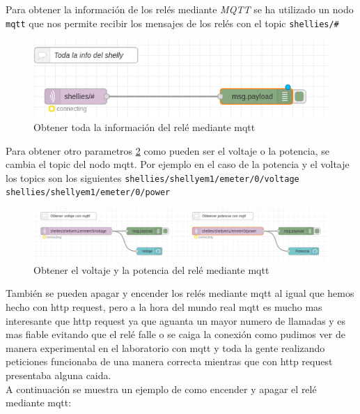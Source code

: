 \documentclass[11pt, letterpaper]{article}
\begin{document}
Para obtener la información de los relés mediante \textit{MQTT} se ha utilizado un nodo \texttt{mqtt} que nos permite 
recibir los mensajes de los relés con el topic \texttt{shellies/\#} 

\begin{figure}[h]
    \centering
    \includegraphics[width=\textwidth]{info_shelly_mqtt.png}
    \caption{Obtener toda la información del relé mediante mqtt} 
    \label{fig:info_shelly_mqtt}
\end{figure}
\pagebreak
Para obtener otro parametros \ref{fig:voltaje_pontencia_mqtt} como pueden ser el voltaje o la potencia, se cambia el topic del nodo mqtt.
Por ejemplo en el caso de la potencia y el voltaje los topics son los siguientes \texttt{shellies/shellyem1/emeter/0/voltage}
\texttt{shellies/shellyem1/emeter/0/power} 

\begin{figure}[h]
    \centering
    \includegraphics[width=\textwidth]{Voltaje_potencia_mqtt.png}
    \caption{Obtener el voltaje y la potencia del relé mediante mqtt}
    \label{fig:voltaje_pontencia_mqtt}
\end{figure}

También se pueden apagar y encender los relés mediante mqtt al igual que hemos hecho con http request, pero a la hora 
del mundo real mqtt es mucho mas interesante que http request ya que aguanta un mayor numero de llamadas y es mas fiable evitando 
que el relé falle o se caiga la conexión como pudimos ver de manera experimental en el laboratorio con mqtt y toda la gente realizando peticiones
funcionaba de una manera correcta mientras que con http request presentaba alguna caida.\\


A continuación se muestra un ejemplo de como encender y apagar el relé mediante mqtt:
\end{document}
